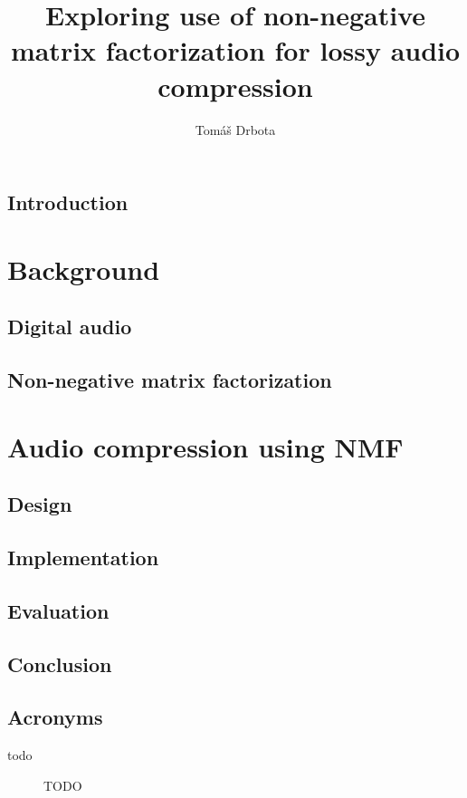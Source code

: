 \documentclass[thesis=M,english,hidelinks]{FITthesis}[2018/03/12]
\title{Exploring use of non-negative matrix factorization for lossy audio compression}
\author{Tomáš Drbota} %
\begin{document}
\chapter{Introduction}



\part{Background}
\chapter{Digital audio}


\chapter{Non-negative matrix factorization}


\part{Audio compression using NMF}
\chapter{Design}


\chapter{Implementation}


\chapter{Evaluation}


\chapter{Conclusion}





\appendix

\chapter{Acronyms}
\begin{description}
	\item[todo] TODO
\end{description}
\end{document}
